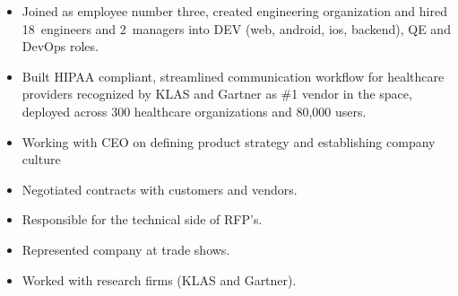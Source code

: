 \documentclass[11pt,a4paper,roman]{moderncv}       %
\begin{document}
\begin{itemize}


\end{itemize}

\bigskip




\begin{itemize}
    \item Joined as employee number three, created engineering organization and hired 18~engineers and 2~managers into DEV (web, android, ios, backend), QE and DevOps roles. 
    \item Built HIPAA compliant, streamlined communication workflow for healthcare providers recognized by KLAS and Gartner as \#1 vendor in the space, deployed across 300 healthcare organizations and 80,000 users.
    \item Working with CEO on defining product strategy and establishing company culture 
    \item Negotiated contracts with customers and vendors.
    \item Responsible for the technical side of RFP's.
    \item Represented company at trade shows.
    \item Worked with research firms (KLAS and Gartner).
\end{itemize}
\end{document}
